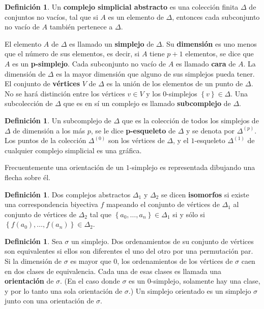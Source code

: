 \documentclass[12pt]{book}
\theoremstyle{definition}
\newtheorem{definition}[theorem]{Definición}
\newcounter{in}
\newcounter{ini}
\begin{document}
\begin{definition}
  \label{dasc}
  Un \textbf{complejo simplicial abstracto} es una colección
  finita $\Delta$ de conjuntos no vacíos, tal que si $A$ es un
  elemento de $\Delta$, entonces cada subconjunto no vacío de $A$
  también pertenece a $\Delta$.
\end{definition}

El elemento $A$ de $\Delta$ es llamado un \textbf{simplejo}
de $\Delta$. Su \textbf{dimensión} es uno menos que el número
de sus elementos, es decir, si $A$ tiene $p+1$ elementos, se dice que
$A$ es un \textbf{p-simplejo}. Cada subconjunto no vacío de
$A$ es llamado \textbf{cara} de $A$.  La dimensión de $\Delta$
  es la mayor dimensión que alguno de sus simplejos pueda tener. El
  conjunto de \textbf{vértices} $V$ de $\Delta$ es la unión
  de los elementos de un punto de $\Delta$. No se hará distinción
  entre los vértices $v \in V$ y los $0$-simplejos
  $\left\{ v \right\} \in \Delta$. Una subcolección de $\Delta$ que es
  en sí un complejo es llamado \textbf{subcomplejo} de
    $\Delta$.

\begin{definition}
  \label{psk}
  Un subcomplejo de $\Delta$ que es la colección de todos los
  simplejos de $\Delta$ de dimensión a los más $p$, se le dice
  \textbf{p-esqueleto} de $\Delta$ y se denota por
  $\Delta^{(p)}$. Los puntos de la colección $\Delta^{(0)}$ son los
  vértices de $\Delta$, y el $1$-esqueleto $\Delta^{(1)}$ de cualquier
  complejo simplicial es una gráfica.
\end{definition}

Frecuentemente una orientación de un $1$-simplejo es representada
dibujando una flecha sobre él.
\begin{definition}
Dos complejos abstractos $\Delta_{1}$ y $\Delta_{2}$ se dicen
\textbf{isomorfos} si existe una correspondencia biyectiva
$f$ mapeando el conjunto de vértices de $\Delta_{1}$ al conjunto de
vértices de $\Delta_{2}$ tal que
$\left\{ a_{0}, \ldots, a_{n} \right\} \in \Delta_{1}$ si y sólo si
$\left\{ f(a_{0}), \ldots, f(a_{n}) \right\} \in \Delta_{2}$.
\end{definition}
\begin{definition}
  \label{v_s} 
  Sea $\sigma$ un simplejo. Dos ordenamientos de su
  conjunto de vértices son equivalentes si ellos son diferentes el uno
  del otro por una permutación par. Si la dimensión de $\sigma$ es
  mayor que $0$, los ordenamientos de los vértices de $\sigma$ caen en
  dos clases de equivalencia. Cada una de esas clases es llamada una
  \textbf{orientación} de $\sigma$. (En el caso donde $\sigma$ es un
  $0$-simplejo, solamente hay una clase, y por lo tanto una sola
  orientación de $\sigma$.) Un simplejo orientado es un simplejo
  $\sigma$ junto con una orientación de $\sigma$.
\end{definition}
\end{document}
